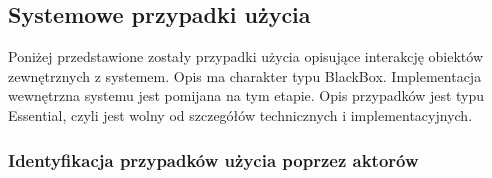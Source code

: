 \documentclass[10pt,a4paper,titlepage]{article} %
\begin{document}
		 
		\subsection{Systemowe przypadki użycia}
		Poniżej przedstawione zostały przypadki użycia opisujące interakcję obiektów zewnętrznych z systemem.\newline
		Opis ma charakter typu BlackBox. Implementacja wewnętrzna systemu jest pomijana na tym etapie. Opis przypadków jest typu Essential, czyli jest wolny od szczegółów technicznych i implementacyjnych.\newline

		\subsubsection{Identyfikacja przypadków użycia poprzez aktorów}
\end{document}
